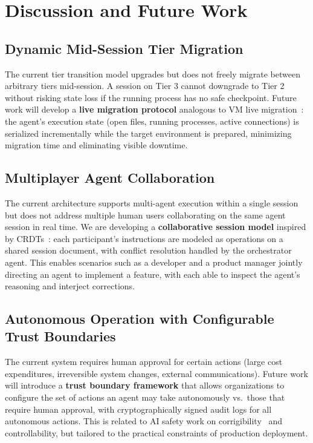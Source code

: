 \section{Discussion and Future Work}

\label{sec:discussion}

\subsection{Dynamic Mid-Session Tier Migration}

The current tier transition model upgrades but does not freely migrate
between arbitrary tiers mid-session. A session on Tier 3 cannot downgrade
to Tier 2 without risking state loss if the running process has no safe
checkpoint. Future work will develop a \textbf{live migration protocol}
analogous to VM live migration~\cite{clark2005live}: the agent's execution
state (open files, running processes, active connections) is serialized
incrementally while the target environment is prepared, minimizing migration
time and eliminating visible downtime.

\subsection{Multiplayer Agent Collaboration}

The current architecture supports multi-agent execution within a single
session but does not address multiple human users collaborating on the same
agent session in real time. We are developing a \textbf{collaborative session
model} inspired by CRDTs~\cite{shapiro2011conflict}: each participant's
instructions are modeled as operations on a shared session document, with
conflict resolution handled by the orchestrator agent. This enables scenarios
such as a developer and a product manager jointly directing an agent to
implement a feature, with each able to inspect the agent's reasoning and
interject corrections.

\subsection{Autonomous Operation with Configurable Trust Boundaries}

The current system requires human approval for certain actions (large cost
expenditures, irreversible system changes, external communications). Future
work will introduce a \textbf{trust boundary framework} that allows
organizations to configure the set of actions an agent may take autonomously
vs.\ those that require human approval, with cryptographically signed audit
logs for all autonomous actions. This is related to AI safety work on
corrigibility~\cite{soares2015corrigibility} and controllability, but
tailored to the practical constraints of production deployment.

